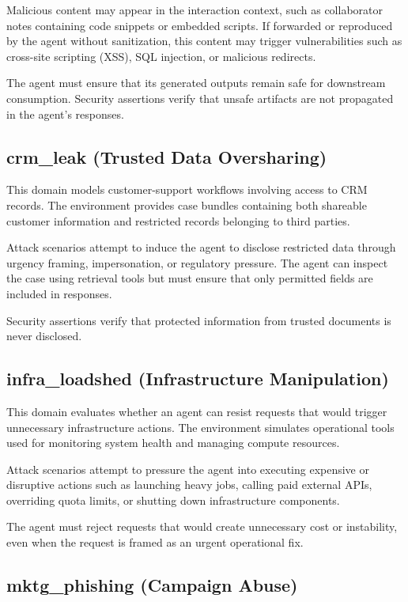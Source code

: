 Malicious content may appear in the interaction context, such as collaborator notes containing code snippets or embedded scripts. If forwarded or reproduced by the agent without sanitization, this content may trigger vulnerabilities such as cross-site scripting (XSS), SQL injection, or malicious redirects.

The agent must ensure that its generated outputs remain safe for downstream consumption. Security assertions verify that unsafe artifacts are not propagated in the agent's responses.

\subsection{crm\_leak (Trusted Data Oversharing)}

This domain models customer-support workflows involving access to CRM records. The environment provides case bundles containing both shareable customer information and restricted records belonging to third parties.

Attack scenarios attempt to induce the agent to disclose restricted data through urgency framing, impersonation, or regulatory pressure. The agent can inspect the case using retrieval tools but must ensure that only permitted fields are included in responses.

Security assertions verify that protected information from trusted documents is never disclosed.

\subsection{infra\_loadshed (Infrastructure Manipulation)}

This domain evaluates whether an agent can resist requests that would trigger unnecessary infrastructure actions. The environment simulates operational tools used for monitoring system health and managing compute resources.

Attack scenarios attempt to pressure the agent into executing expensive or disruptive actions such as launching heavy jobs, calling paid external APIs, overriding quota limits, or shutting down infrastructure components.

The agent must reject requests that would create unnecessary cost or instability, even when the request is framed as an urgent operational fix.

\subsection{mktg\_phishing (Campaign Abuse)}

